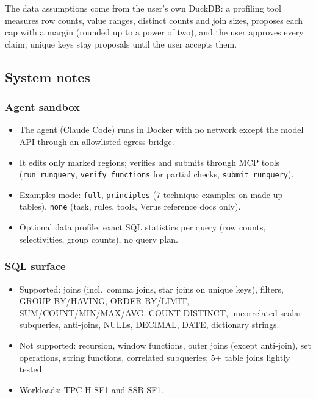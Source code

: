 \documentclass[
]{article}
\newcounter{none} %
\providecommand{\tightlist}{%
  \setlength{\itemsep}{0pt}\setlength{\parskip}{0pt}}
\begin{document}
The data assumptions come from the user's own DuckDB: a profiling tool
measures row counts, value ranges, distinct counts and join sizes,
proposes each cap with a margin (rounded up to a power of two), and the
user approves every claim; unique keys stay proposals until the user
accepts them.

\subsection{System notes}\label{system-notes}

\subsubsection{Agent sandbox}\label{agent-sandbox}

\begin{itemize}
\tightlist
\item
  The agent (Claude Code) runs in Docker with no network except the
  model API through an allowlisted egress bridge.
\item
  It edits only marked regions; verifies and submits through MCP tools
  (\texttt{run\_runquery}, \texttt{verify\_functions} for partial
  checks, \texttt{submit\_runquery}).
\item
  Examples mode: \texttt{full}, \texttt{principles} (7 technique
  examples on made-up tables), \texttt{none} (task, rules, tools, Verus
  reference docs only).
\item
  Optional data profile: exact SQL statistics per query (row counts,
  selectivities, group counts), no query plan.
\end{itemize}

\subsubsection{SQL surface}\label{sql-surface}

\begin{itemize}
\tightlist
\item
  Supported: joins (incl.~comma joins, star joins on unique keys),
  filters, GROUP BY/HAVING, ORDER BY/LIMIT, SUM/COUNT/MIN/MAX/AVG, COUNT
  DISTINCT, uncorrelated scalar subqueries, anti-joins, NULLs, DECIMAL,
  DATE, dictionary strings.
\item
  Not supported: recursion, window functions, outer joins (except
  anti-join), set operations, string functions, correlated subqueries;
  5+ table joins lightly tested.
\item
  Workloads: TPC-H SF1 and SSB SF1.
\end{itemize}
\end{document}
